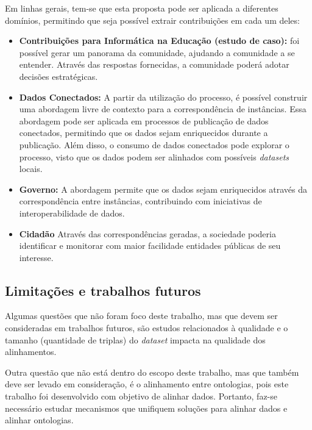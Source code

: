 Em linhas gerais, tem-se que esta proposta pode ser aplicada a diferentes domínios, permitindo que seja possível extrair contribuições em cada um deles:

\begin{itemize}
\item \textbf{Contribuições para Informática na Educação (estudo de caso):} foi possível gerar um panorama da comunidade, ajudando a comunidade a se entender. Através das respostas fornecidas, a comunidade poderá adotar decisões estratégicas.
\item \textbf{Dados Conectados:} A partir da utilização do processo, é possível construir uma abordagem livre de contexto para a correspondência de instâncias. Essa abordagem pode ser aplicada em processos de publicação de dados conectados, permitindo que os dados sejam enriquecidos durante a publicação. Além disso, o consumo de dados conectados pode explorar o processo, visto que os dados podem ser alinhados com possíveis \textit{datasets} locais.
\item \textbf{Governo:} A abordagem permite que os dados sejam enriquecidos através da correspondência entre instâncias, contribuindo com iniciativas de interoperabilidade de dados.
\item \textbf{Cidadão} Através das correspondências geradas, a sociedade poderia identificar e monitorar com maior facilidade entidades públicas de seu interesse.
\end{itemize}
\subsection{Limitações e trabalhos futuros}

Algumas questões que não foram foco deste trabalho, mas que devem ser consideradas em trabalhos futuros, são estudos relacionados à qualidade e o tamanho (quantidade de triplas) do \textit{dataset} impacta na qualidade dos alinhamentos.

Outra questão que não está dentro do escopo deste trabalho, mas que também deve ser levado em consideração, é o alinhamento entre ontologias, pois este trabalho foi desenvolvido com objetivo de alinhar dados. Portanto, faz-se necessário estudar mecanismos que unifiquem soluções para alinhar dados e alinhar ontologias.

